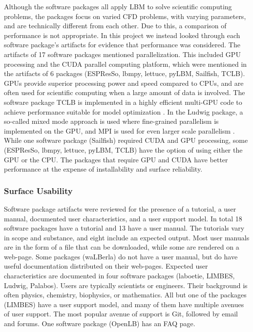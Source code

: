 \documentclass[12pt, notitlepage]{article}
\begin{document}
Although the software packages all apply LBM to solve scientific computing problems, the packages focus on varied CFD problems, with varying parameters, and are technically different from each other. Due to this, a comparison of performance is not appropriate. In this project we instead looked through each software package's artifacts for evidence that performance was considered. The artifacts of 17 software packages mentioned parallelization. This included GPU processing and the CUDA parallel computing platform, which were mentioned in the artifacts of 6 packages (ESPResSo, lbmpy, lettuce, pyLBM, Sailfish, TCLB). GPUs provide superior processing power and speed compared to CPUs, and are often used for scientific computing when a large amount of data is involved. The software package TCLB is implemented in a highly efficient multi-GPU code to achieve performance suitable for model optimization \citep{rutkowski2020open}. In the Ludwig package, a so-called mixed mode approach is used where fine-grained parallelism is implemented on the GPU, and MPI is used for even larger scale parallelism \citep{gray2013ludwig}. While one software package (Sailfish) required CUDA and GPU processing, some (ESPResSo, lbmpy, lettuce, pyLBM, TCLB) have the option of using either the GPU or the CPU. The packages that require GPU and CUDA have better performance at the expense of installability and surface reliability.

\subsubsection{Surface Usability}

Software package artifacts were reviewed for the presence of a tutorial, a user manual, documented user characteristics, and a user support model. In total 18 software packages have a tutorial and 13 have a user manual. The tutorials vary in scope and substance, and eight include an expected output. Most user manuals are in the form of a file that can be downloaded, while some are rendered on a web-page. Some packages (waLBerla) do not have a user manual, but do have useful documentation distributed on their web-pages. Expected user characteristics are documented in four software packages (laboetie, LIMBES, Ludwig, Palabos). Users are typically scientists or engineers. Their background is often physics, chemistry, biophysics, or mathematics. All but one of the packages (LIMBES) have a user support model, and many of them have multiple avenues of user support. The most popular avenue of support is Git, followed by email and forums. One software package (OpenLB) has an FAQ page.    
\end{document}
